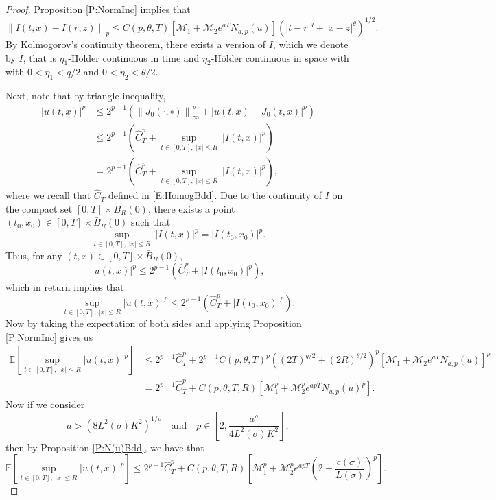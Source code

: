 \documentclass[a4paper,11pt]{article}
\numberwithin{equation}{section}
\theoremstyle{plain}
\theoremstyle{definition}
\newcommand{\Norm}[1]{\left\|  #1   \right\|}
\numberwithin{NQ}{section}
\numberwithin{LQ}{section}
\numberwithin{ZQ}{section}
\begin{document}
  \begin{proof}
    Proposition \ref{P:NormInc} implies that
		\begin{equation}
		\Norm{I(t,x) - I(r,z)}_p \le C(p,\theta, T)\left[ \mathcal{M}_1 + \mathcal{M}_2e^{aT}N_{a,p}(u) \right]\left(|t-r|^{q} + |x-z|^{\theta}\right)^{1/2}.
		\end{equation}
    By Kolmogorov's continuity theorem, there exists a version of $I$, which we denote by $I$, that
    is $\eta_1$-H\"older continuous in time and $\eta_2$-H\"older continuous in space with with
    $0<\eta_1 < q/2$ and $0<\eta_2 < \theta/2$.

    Next, note that by triangle inequality,
		\begin{align*}
		|u(t,x)|^p &\le 2^{p-1}\left( \Norm{J_0(\cdot,\circ)}_{\infty}^p + |u(t,x)-J_0(t,x)|^p \right) \\
		&\le 2^{p-1}\left( \widehat{C}_T^p + \sup_{t\in[0,T],\; |x| \le R} \: |I(t,x)|^p \right) \\
		&= 2^{p-1}\left( \widehat{C}_T^p + \sup_{t\in[0,T],\; |x| \le R} \: |I(t,x)|^p\right),
		\end{align*}
    where we recall that $\widehat{C}_T$ defined in \eqref{E:HomogBdd}. Due to the continuity of $I$
    on the compact set $[0,T] \times \bar{B}_R(0)$, there exists a point $(t_0,x_0) \in [0,T] \times
    \bar{B}_R(0)$ such that
		\[
		\sup_{t\in[0,T],\; |x| \le R} \: |I(t,x)|^p = |I(t_0,x_0)|^p.
		\]
    Thus, for any $(t,x) \in [0,T] \times \bar{B}_R(0)$,
		\[
		|u(t,x)|^p \le 2^{p-1}\left( \widehat{C}_T^p  + |I(t_0,x_0)|^p \right),
		\]
    which in return implies that
		\[
		\sup_{t\in[0,T],\; |x| \le R} |u(t,x)|^p \le 2^{p-1}\left(\widehat{C}_T^p + |I(t_0,x_0)|^p \right).
		\]
    Now by taking the expectation of both sides and applying Proposition \ref{P:NormInc} gives us
		\begin{align*}
		\mathbb{E}\left[ \sup_{t\in[0,T],\; |x| \le R} |u(t,x)|^p \right] &\le  2^{p-1}\widehat{C}_T^p  + 2^{p-1}C(p, \theta, T)^p\left((2T)^{q/2} + (2R)^{\theta /2}\right)^p\left[ \mathcal{M}_1 + \mathcal{M}_2 e^{aT} N_{a,p}(u)\right]^p \\
		&= 2^{p-1}\widehat{C}_T^p  + C(p, \theta, T,R) \left[ \mathcal{M}_1^p + \mathcal{M}_2^p e^{apT} N_{a,p}(u)^p\right].
		\end{align*}
    Now if we consider
		\[
		a > \left( 8 L^2(\sigma)K^2\right)^{1/\rho} \quad \text{and} \quad 	p \in \left[ 2, \frac{a^{\rho}}{4L^2(\sigma)K^2} \right],
		\]
    then by Proposition \ref{P:N(u)Bdd}, we have that
		\[
		\mathbb{E}\left[ \sup_{t\in[0,T],\; |x| \le R} |u(t,x)|^p \right] \le 2^{p-1}\widehat{C}_T^p  + C(p, \theta, T,R) \left[ \mathcal{M}_1^p + \mathcal{M}_2^p e^{apT} \left(2 +  \frac{c(\sigma)}{L(\sigma)}\right)^p\right].
		\]
  \end{proof}
\end{document}
